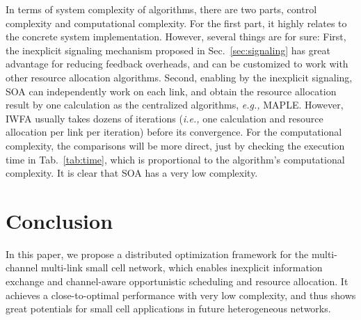 \documentclass[conference]{IEEEtran}
\newcommand{\ie}{\emph{i.e., }}
\newcommand{\eg}{\emph{e.g., }}
\begin{document}
In terms of system complexity of algorithms, there are two parts, control complexity and computational complexity. For the first part, it highly relates to the concrete system implementation. However, several things are for sure: First, the inexplicit signaling mechanism proposed in Sec.~\ref{sec:signaling} has great advantage for reducing feedback overheads, and can be customized to work with other resource allocation algorithms. Second, enabling by the inexplicit signaling, SOA can independently work on each link, and obtain the resource allocation result by one calculation as the centralized algorithms, \eg MAPLE. However, IWFA usually takes dozens of iterations (\ie one calculation and resource allocation per link per iteration) before its convergence. For the computational complexity, the comparisons will be more direct, just by checking the execution time in Tab.~\ref{tab:time}, which is proportional to the algorithm's computational complexity. It is clear that SOA has a very low complexity.



\section{Conclusion}
\label{sec:conclusion}


In this paper, we propose a distributed optimization framework for the
multi-channel multi-link small cell network, which enables inexplicit information exchange and channel-aware opportunistic scheduling and resource allocation. It achieves a close-to-optimal performance with very low complexity, and thus shows great potentials for small cell applications in future heterogeneous networks.
\end{document}
